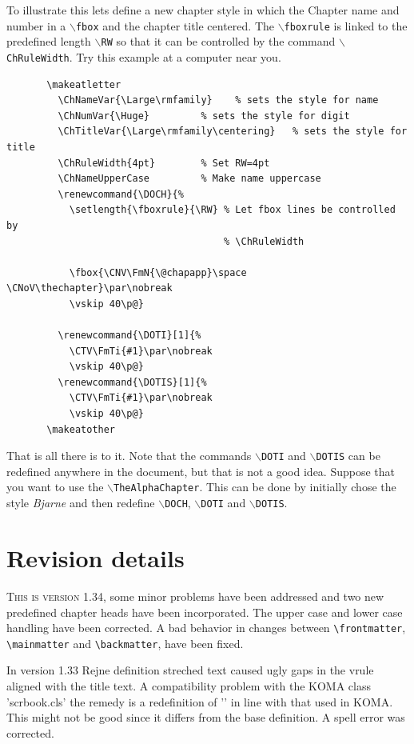 \documentclass{report}
\newcommand{\A}[1]{{$\backslash${\tt #1}}}
\begin{document}
    To illustrate this lets define a new chapter style in which the
    Chapter name and number in a \A{fbox} and the chapter title
    centered. The \A{fboxrule} is linked to the predefined length
    \A{RW} so that it can be controlled by the command
    \A{ChRuleWidth}. Try this example at a computer near you.
    \begin{verbatim}
       \makeatletter
         \ChNameVar{\Large\rmfamily}    % sets the style for name
         \ChNumVar{\Huge}         % sets the style for digit
         \ChTitleVar{\Large\rmfamily\centering}   % sets the style for title
         \ChRuleWidth{4pt}        % Set RW=4pt
         \ChNameUpperCase         % Make name uppercase
         \renewcommand{\DOCH}{%
           \setlength{\fboxrule}{\RW} % Let fbox lines be controlled by
                                      % \ChRuleWidth

           \fbox{\CNV\FmN{\@chapapp}\space \CNoV\thechapter}\par\nobreak
           \vskip 40\p@}

         \renewcommand{\DOTI}[1]{%
           \CTV\FmTi{#1}\par\nobreak
           \vskip 40\p@}
         \renewcommand{\DOTIS}[1]{%
           \CTV\FmTi{#1}\par\nobreak
           \vskip 40\p@}
       \makeatother
    \end{verbatim}
    That is all there is to it. Note that the commands \A{DOTI} and
    \A{DOTIS} can be redefined anywhere in the document, but that is
    not a good idea. Suppose that you want to use the
    \A{TheAlphaChapter}. This can be done by initially chose the style
    {\em Bjarne}\/ and then redefine \A{DOCH}, \A{DOTI} and \A{DOTIS}.
    \chapter{Revision details}
     \lettrine{T}{his is version 1.34}, some minor problems have been
     addressed and two new predefined chapter heads have been
     incorporated. The upper case and lower case handling have been
     corrected. A bad behavior in changes between \verb+\frontmatter+,
     \verb+\mainmatter+ and  \verb+\backmatter+, have been fixed.   

     In version 1.33 Rejne definition streched text caused ugly gaps
     in the vrule aligned with the title text. A compatibility problem
     with the KOMA class 'scrbook.cls' the remedy is a redefinition of
     '\@schapter' in line with that used in KOMA. This might not be
     good since it differs from the base definition. A spell error was
     corrected.
 
\end{document}

